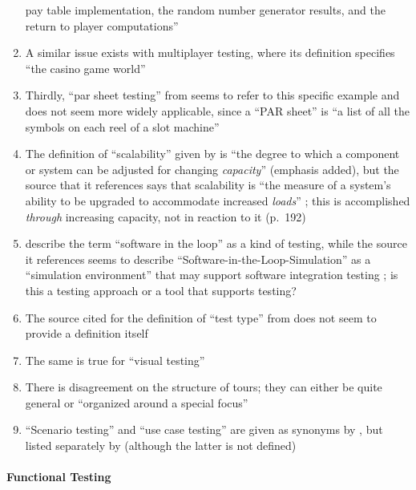 \begin{enumerate}
            pay table implementation, the random number generator results, and
            the return to player computations''
      \item A similar issue exists with multiplayer testing, where its
            definition specifies ``the casino game world'' 
      \item Thirdly, ``par sheet testing'' from  seems to
            refer to this specific example and does not seem more widely
            applicable, since a ``PAR sheet'' is ``a list of all the symbols
            on each reel of a slot machine'' \citep{Bluejay2024}
      \item The definition of ``scalability'' given by  is
            ``the degree to which a component or system can be adjusted for
            changing \emph{capacity}'' (emphasis added), but the source that it
            references says that scalability is ``the measure of a system's
            ability to be upgraded to accommodate increased \emph{loads}''
            \citep[p.~381, emphasis added]{GerrardAndThompson2002}; this is
            accomplished \emph{through} increasing capacity, not in reaction to
            it (p.~192)
      \item {} describe the term ``software in the loop'' as a
            kind of testing, while the source it references seems to describe
            ``Software-in-the-Loop-Simulation'' as a ``simulation environment''
            that may support software integration testing
            \citep[p.~153]{SPICE2022}; is this a testing approach or a tool
            that supports testing?
      \item The source cited for the definition of ``test type'' from
             does not seem to provide a definition itself
      \item The same is true for ``visual testing''
      \item There is disagreement on the structure of tours; they can either be
            quite general \citep[p.~34]{IEEE2022} or ``organized around a
            special focus'' 
      \item ``Scenario testing'' and ``use case testing'' are given as synonyms
            by , but listed separately by
            \citet[p.~22]{IEEE2022} (although the latter is not defined)
\end{enumerate}

\paragraph{Functional Testing}

